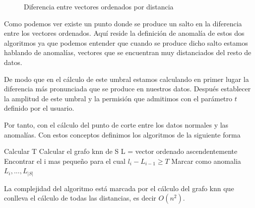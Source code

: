 \begin{figure}[h]
    \caption{\label{fig:explica-salto} Diferencia entre vectores ordenados por distancia}
\end{figure}


Como podemos ver existe un punto donde se produce un salto en la diferencia entre los vectores
ordenados. Aquí reside la definición de anomalía de estos dos algoritmos ya que podemos entender
que cuando se produce dicho salto estamos hablando de anomalías, vectores que se encuentran
muy distanciados del resto de datos. 

De modo que en el cálculo de este umbral estamos calculando en primer lugar la diferencia
más pronunciada que se produce en nuestros datos. Después establecer la amplitud de este
umbral y la permisión que admitimos con el parámetro $t$ definido por el usuario. 

Por tanto, con el cálculo del punto de corte entre los datos 
normales y las anomalías. Con estos conceptos definimos los algoritmos de la siguiente forma

\begin{codigo}
    \begin{algorithmic}[1]
    \State Calcular T
    \State Calcular el grafo knn de S
    \State L = vector ordenado ascendentemente
    \State Encontrar el i mas pequeño para el cual $ l_i - L_{i-1}  \geq T$
    \State Marcar como anomalia $L_i , ... , L_{|S|}$ 
    \EndFunction 
    \end{algorithmic}
\end{codigo}

La complejidad del algoritmo está marcada por el cálculo del grafo knn que conlleva
el cálculo de todas las distancias, es decir $O(n^2)$.